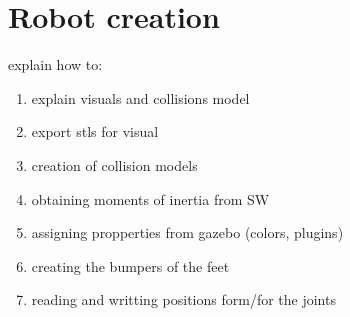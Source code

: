 \section{Robot creation} %
\label{sec:robot_creation}
explain how to:
\begin{enumerate}
  \item explain visuals and collisions model
  \item export stls for visual
  \item creation of collision models
  \item obtaining moments of inertia from SW
  \item assigning propperties from gazebo (colors, plugins)
  \item creating the bumpers of the feet
  \item reading and writting positions form/for the joints
\end{enumerate}

